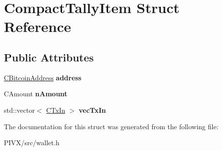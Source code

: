 \hypertarget{struct_compact_tally_item}{}\section{Compact\+Tally\+Item Struct Reference}
\label{struct_compact_tally_item}
\subsection*{Public Attributes}
\begin{DoxyCompactItemize}
\item 
\mbox{\label{struct_compact_tally_item_a5ede18db63876797ed696a53e4ed840f}} 
\mbox{\hyperlink{class_c_bitcoin_address}{C\+Bitcoin\+Address}} {\bfseries address}
\item 
\mbox{\label{struct_compact_tally_item_a0efb39fdaacf62d56f5cb90261b71402}} 
C\+Amount {\bfseries n\+Amount}
\item 
\mbox{\label{struct_compact_tally_item_aaa4af089e3d784811ebadd4eb89eb54b}} 
std\+::vector$<$ \mbox{\hyperlink{class_c_tx_in}{C\+Tx\+In}} $>$ {\bfseries vec\+Tx\+In}
\end{DoxyCompactItemize}


The documentation for this struct was generated from the following file\+:\begin{DoxyCompactItemize}
\item 
P\+I\+V\+X/src/wallet.\+h\end{DoxyCompactItemize}

